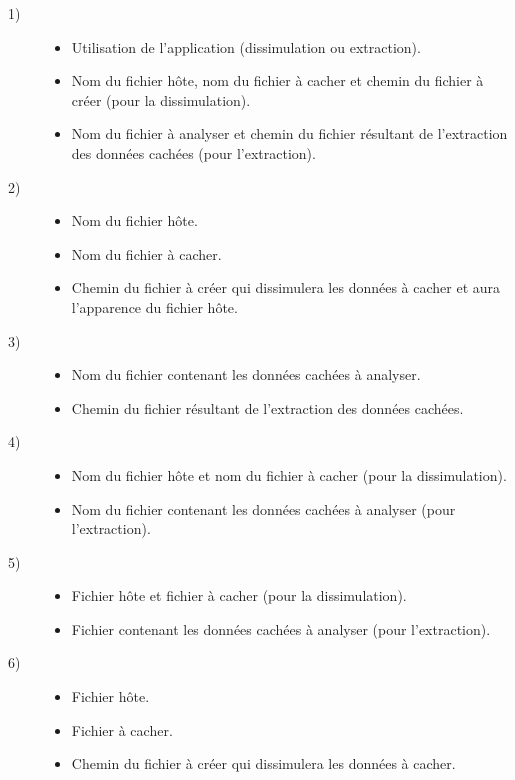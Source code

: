 \documentclass[11pt]{article}
\begin{document}
\begin{description}

\item[1)] 
\begin{itemize}
\item Utilisation de l'application (dissimulation ou extraction).
\item Nom du fichier hôte, nom du fichier à cacher et chemin du fichier à créer
    (pour la dissimulation).
\item Nom du fichier à analyser et chemin du fichier résultant de l'extraction
    des données cachées (pour l'extraction).
\end{itemize}
\item[2)] 
\begin{itemize}
\item Nom du fichier hôte.
\item Nom du fichier à cacher.
\item Chemin du fichier à créer qui dissimulera les données à cacher et aura
    l'apparence du fichier hôte.
\end{itemize}
\item[3)] 
\begin{itemize}
\item Nom du fichier contenant les données cachées à analyser.
\item Chemin du fichier résultant de l'extraction des données cachées.
\end{itemize}
\item[4)] 
\begin{itemize}
\item Nom du fichier hôte et nom du fichier à cacher (pour la dissimulation).
\item Nom du fichier contenant les données cachées à analyser (pour
    l'extraction).
\end{itemize}
\item[5)]
\begin{itemize}
\item Fichier hôte et fichier à cacher (pour la dissimulation).
\item Fichier contenant les données cachées à analyser (pour l'extraction).
\end{itemize}
\item[6)]
\begin{itemize}
\item Fichier hôte.
\item Fichier à cacher.
\item Chemin du fichier à créer qui dissimulera les données à cacher.

\end{itemize}
\end{description}
\end{document}
